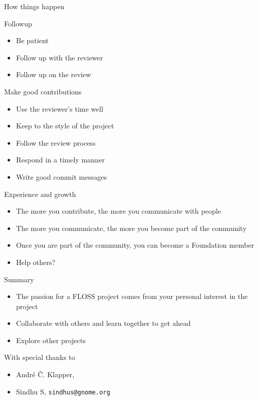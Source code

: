 \documentclass{beamer}
\begin{document}
\begin{frame}{How things happen}
\end{frame}

\begin{frame}{Followup}
  \begin{itemize}
  \item
    Be patient
  \item
    Follow up with the reviewer
  \item
    Follow up on the review
  \end{itemize}
\end{frame}

\begin{frame}{Make good contributions}
  \begin{itemize}
  \item
    Use the reviewer's time well
  \item
    Keep to the style of the project
  \item
    Follow the review process
  \item
    Respond in a timely manner
  \item
    Write good commit messages
  \end{itemize}
\end{frame}

\begin{frame}{Experience and growth}
  \begin{itemize}
  \item
    The more you contribute, the more you communicate with people
  \item
    The more you communicate, the more you become part of the community
  \item
    Once you are part of the community, you can become a Foundation member
  \end{itemize} 
  \begin{itemize}
  \item
    Help others?
  \end{itemize}
\end{frame}

\begin{frame}{Summary}
  \begin{itemize}
  \item
    The \alert{passion} for a FLOSS project comes from your personal interest in the project
  \item
    \alert{Collaborate} with others and \alert{learn together} to get ahead
  \item
    \alert{Explore} other projects
  \end{itemize}
  
  With special thanks to
  \begin{itemize}
  \item
    Andr\'{e} \v{C}. Klapper, \texttt{} 
  \item
    Sindhu S, \texttt{sindhus@gnome.org}
  \end{itemize}
\end{frame}
\end{document}
